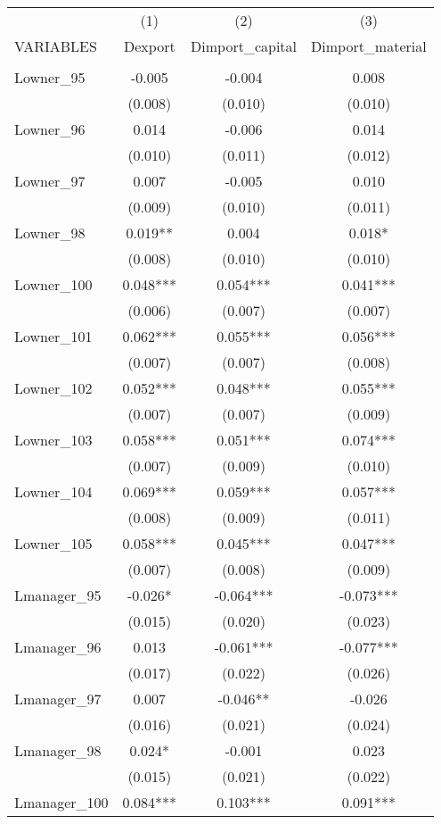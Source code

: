\begin{tabular}{lccc} \hline
 & (1) & (2) & (3) \\
VARIABLES & Dexport & Dimport\_capital & Dimport\_material \\ \hline
 &  &  &  \\
Lowner\_95 & -0.005 & -0.004 & 0.008 \\
 & (0.008) & (0.010) & (0.010) \\
Lowner\_96 & 0.014 & -0.006 & 0.014 \\
 & (0.010) & (0.011) & (0.012) \\
Lowner\_97 & 0.007 & -0.005 & 0.010 \\
 & (0.009) & (0.010) & (0.011) \\
Lowner\_98 & 0.019** & 0.004 & 0.018* \\
 & (0.008) & (0.010) & (0.010) \\
Lowner\_100 & 0.048*** & 0.054*** & 0.041*** \\
 & (0.006) & (0.007) & (0.007) \\
Lowner\_101 & 0.062*** & 0.055*** & 0.056*** \\
 & (0.007) & (0.007) & (0.008) \\
Lowner\_102 & 0.052*** & 0.048*** & 0.055*** \\
 & (0.007) & (0.007) & (0.009) \\
Lowner\_103 & 0.058*** & 0.051*** & 0.074*** \\
 & (0.007) & (0.009) & (0.010) \\
Lowner\_104 & 0.069*** & 0.059*** & 0.057*** \\
 & (0.008) & (0.009) & (0.011) \\
Lowner\_105 & 0.058*** & 0.045*** & 0.047*** \\
 & (0.007) & (0.008) & (0.009) \\
Lmanager\_95 & -0.026* & -0.064*** & -0.073*** \\
 & (0.015) & (0.020) & (0.023) \\
Lmanager\_96 & 0.013 & -0.061*** & -0.077*** \\
 & (0.017) & (0.022) & (0.026) \\
Lmanager\_97 & 0.007 & -0.046** & -0.026 \\
 & (0.016) & (0.021) & (0.024) \\
Lmanager\_98 & 0.024* & -0.001 & 0.023 \\
 & (0.015) & (0.021) & (0.022) \\
Lmanager\_100 & 0.084*** & 0.103*** & 0.091*** \\

\end{tabular}
